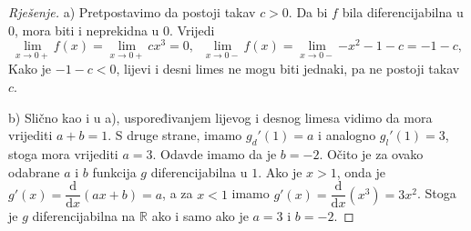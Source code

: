 \begin{proof}[Rješenje]
a) Pretpostavimo da postoji takav \(c>0\). Da bi \(f\) bila diferencijabilna u \(0\), mora biti i neprekidna u \(0\). Vrijedi
\[\lim\limits_{x\to 0+}{f(x)}=\lim\limits_{x\to 0+}{cx^3}=0,\;\; \lim\limits_{x\to 0-}{f(x)}=\lim\limits_{x\to 0-}{-x^2-1-c}=-1-c,\]
Kako je \(-1-c<0\), lijevi i desni limes ne mogu biti jednaki, pa ne postoji takav \(c\).

b) Slično kao i u a), uspoređivanjem lijevog i desnog limesa vidimo da mora vrijediti \(a+b=1\). S druge strane, imamo \(g_d'(1)=a\) i analogno \(g_l'(1)=3\), stoga mora vrijediti \(a=3\). Odavde imamo da je \(b=-2\). Očito je za ovako odabrane \(a\) i \(b\) funkcija \(g\) diferencijabilna u \(1\). Ako je \(x>1\), onda je \(g'(x)=\dfrac{\mathrm{d}}{\mathrm{d}x}(ax+b)=a\), a za \(x<1\) imamo \(g'(x)=\dfrac{\mathrm{d}}{\mathrm{d}x}(x^3)=3x^2\). Stoga je \(g\) diferencijabilna na \(\mathbb{R}\) ako i samo ako je \(a=3\) i \(b=-2\).


\end{proof}
